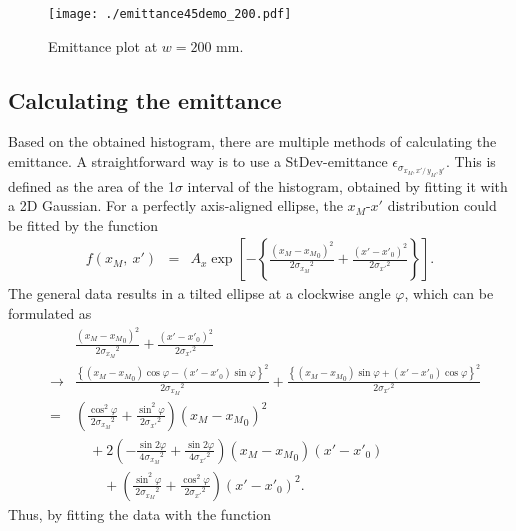 \documentclass{article}
\begin{document}
\begin{figure}[H]
  \begin{center}
    \texttt{[image: ./emittance45demo\_200.pdf]}
    \caption{Emittance plot at $w = 200$ mm.\label{fig:emittance200}}
  \end{center}
\end{figure}




\subsection{Calculating the emittance}
Based on the obtained histogram, there are multiple methods of calculating the emittance. A straightforward way is to use a StDev-emittance $\epsilon_{\sigma_{x_M,x'/\ y_M,y'}}$. This is defined as the area of the 1$\sigma$ interval of the histogram, obtained by fitting it with a 2D Gaussian. For a perfectly axis-aligned ellipse, the $x_M$-$x'$ distribution could be fitted by the function
\begin{eqnarray*}
f(x_M,\ x') & = & A_x \exp{\left[ -\left\{ \frac{\left(x_M-{x_M}_0\right)^2}{2{\sigma_{x_M}}^2} + \frac{\left(x'-{x'}_0\right)^2}{2{\sigma_{x'}}^2} \right\}\right]}.
\end{eqnarray*}
The general data results in a tilted ellipse at a clockwise angle $\varphi$, which can be formulated as
\begin{eqnarray*}
& & \frac{\left(x_M-{x_M}_0\right)^2}{2{\sigma_{x_M}}^2} + \frac{\left(x'-{x'}_0\right)^2}{2{\sigma_{x'}}^2} \\
& \rightarrow & \frac{\left\{ \left(x_M-{x_M}_0\right)\cos{\varphi} - \left(x'-{x'}_0\right)\sin{\varphi} \right\}^2}{2{\sigma_{x_M}}^2} + \frac{\left\{ \left(x_M-{x_M}_0\right)\sin{\varphi} + \left(x'-{x'}_0\right)\cos{\varphi} \right\}^2}{2{\sigma_{x'}}^2} \\
& = & \left( \frac{\cos^2{\varphi}}{2{\sigma_{x_M}}^2} + \frac{\sin^2{\varphi}}{2{\sigma_{x'}}^2} \right) \left( x_M-{x_M}_0 \right)^2 \\
& & \, \, \, \, \, \, + 2 \left( -\frac{\sin{2\varphi}}{4{\sigma_{x_M}}^2} + \frac{\sin{2\varphi}}{4{\sigma_{x'}}^2} \right) \left( x_M-{x_M}_0 \right) \left( x'-{x'}_0 \right) \\
& & \, \, \, \, \, \, \, \, \, \, \, \, + \left( \frac{\sin^2{\varphi}}{2{\sigma_{x_M}}^2} + \frac{\cos^2{\varphi}}{2{\sigma_{x'}}^2} \right) \left( x'-{x'}_0 \right)^2 .
\end{eqnarray*}
Thus, by fitting the data with the function 
\end{document}
